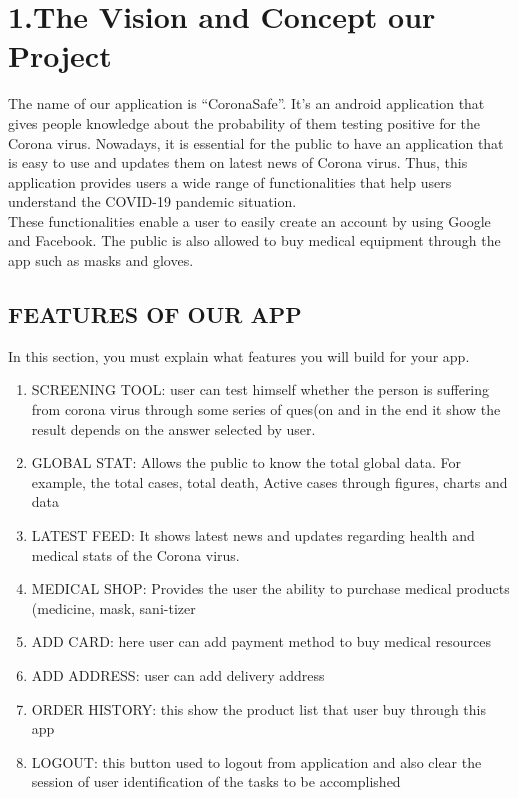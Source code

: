 \section *{\LARGE 1.The Vision and Concept our Project}

The name of our application is “CoronaSafe”. It’s an android application that gives people knowledge about the probability of them testing positive for the Corona virus. Nowadays, it is essential for the public to have an application that is easy to use and updates them on latest news of Corona virus. Thus, this application provides users a wide range of functionalities that help users understand the COVID-19 pandemic situation.
\\
These functionalities enable a user to easily create an account by using Google and Facebook. The public is also allowed to buy medical equipment through the app such as masks and gloves. 

\subsection{FEATURES OF OUR APP}
In this section, you must explain what features you will build for your app.
\begin{enumerate}
    \item SCREENING TOOL: user can test himself whether the person is suffering from corona virus through some series of ques(on and in the end it show the result depends on the answer selected by user.
    \item GLOBAL STAT: Allows the public to know the total global data. For example, the total cases, total death, Active cases through figures, charts and data
    \item LATEST FEED: It shows latest news and updates regarding health and medical stats of the Corona virus.
    \item MEDICAL SHOP: Provides the user the ability to purchase medical products (medicine, mask, sani-tizer
    \item ADD CARD: here user can add payment method to buy medical resources
    \item ADD ADDRESS: user can add delivery address
    \item ORDER HISTORY: this show the product list that user buy through this app
    \item LOGOUT: this button used to logout from application and also clear the session of user identification of the tasks to be accomplished
\end{enumerate}
